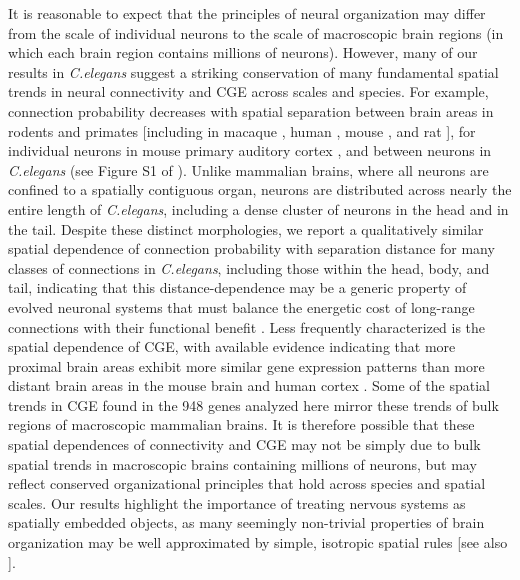 {It is reasonable to expect that the principles of neural organization may differ from the scale of individual neurons to the scale of macroscopic brain regions (in which each brain region contains millions of neurons).
However, many of our results in \emph{C.elegans} suggest a striking conservation of many fundamental spatial trends in neural connectivity and CGE across scales and species.
For example, connection probability decreases with spatial separation between brain areas in rodents and primates \citep{Horvat2016,Wang2016} [including in macaque \citep{Markov2013}, human \citep{Henderson2014}, mouse \citep{Fulcher2016}, and rat \citep{Noori2017}],
for individual neurons in mouse primary auditory cortex \citep{Levy2012},
and between neurons in \emph{C.elegans} (see Figure S1 of \citep{Azulay2016}).
Unlike mammalian brains, where all neurons are confined to a spatially contiguous organ, neurons are distributed across nearly the entire length of \emph{C.elegans}, including a dense cluster of neurons in the head and in the tail.
Despite these distinct morphologies, we report a qualitatively similar spatial dependence of connection probability with separation distance for many classes of connections in \emph{C.elegans}, including those within the head, body, and tail, indicating that this distance-dependence may be a generic property of evolved neuronal systems that must balance the energetic cost of long-range connections with their functional benefit \citep{Bullmore2012, VandenHeuvel2012, Kim2014a, Betzel2016}.
Less frequently characterized is the spatial dependence of CGE, with available evidence indicating that more proximal brain areas exhibit more similar gene expression patterns than more distant brain areas in the mouse brain \citep{Fulcher2016} and human cortex \citep{Krienen2016, Pantazatos2017, Richiardi2017}.
Some of the spatial trends in CGE found in the 948 genes analyzed here mirror these trends of bulk regions of macroscopic mammalian brains.
It is therefore possible that these spatial dependences of connectivity and CGE may not be simply due to bulk spatial trends in macroscopic brains containing millions of neurons, but may reflect conserved organizational principles that hold across species and spatial scales.
Our results highlight the importance of treating nervous systems as spatially embedded objects, as many seemingly non-trivial properties of brain organization may be well approximated by simple, isotropic spatial rules \citep{Henderson2014, Roberts2016, Horvat2016, Bassett2010, Chen2006} [see also \citep{Bullmore2012, Betzel2016}].

}
